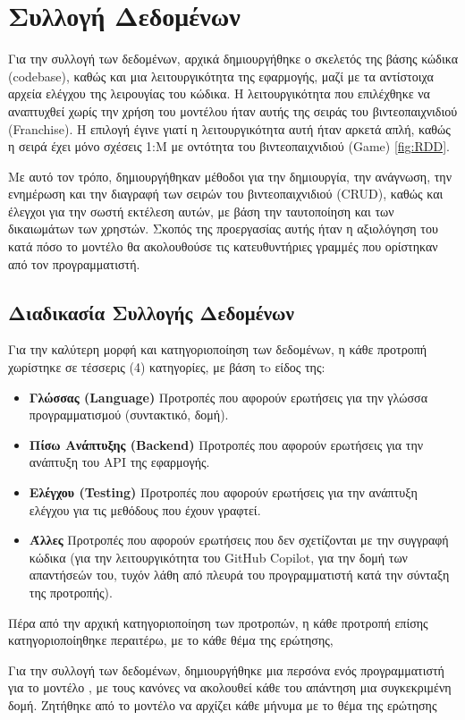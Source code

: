 \section{Συλλογή Δεδομένων}

Για την συλλογή των δεδομένων, αρχικά δημιουργήθηκε ο σκελετός της βάσης κώδικα \textlatin{(codebase)}, καθώς και μια λειτουργικότητα της εφαρμογής, μαζί με τα αντίστοιχα αρχεία ελέγχου της λειρουγίας του κώδικα. Η λειτουργικότητα που επιλέχθηκε να αναπτυχθεί χωρίς την χρήση του μοντέλου ήταν αυτής της σειράς του βιντεοπαιχνιδιού \textlatin{(Franchise)}. Η επιλογή έγινε γιατί η λειτουργικότητα αυτή ήταν αρκετά απλή, καθώς η σειρά έχει μόνο σχέσεις 1:Μ με οντότητα του βιντεοπαιχνιδιού \textlatin{(Game)} \ref{fig:RDD}. 

Με αυτό τον τρόπο, δημιουργήθηκαν μέθοδοι για την δημιουργία, την ανάγνωση, την ενημέρωση και την διαγραφή των σειρών του βιντεοπαιχνιδιού \textlatin{(CRUD)}, καθώς και έλεγχοι για την σωστή εκτέλεση αυτών, με βάση την ταυτοποίηση και των δικαιωμάτων των χρηστών. Σκοπός της προεργασίας αυτής ήταν η αξιολόγηση του κατά πόσο το μοντέλο θα ακολουθούσε τις κατευθυντήριες γραμμές που ορίστηκαν από τον προγραμματιστή.

\subsection{Διαδικασία Συλλογής Δεδομένων}
Για την καλύτερη μορφή και κατηγοριοποίηση των δεδομένων, η κάθε προτροπή χωρίστηκε σε τέσσερις (4) κατηγορίες, με βάση τo είδος της:

\begin{itemize}
  \item \textbf{Γλώσσας (\textlatin{Language})} Προτροπές που αφορούν ερωτήσεις για την γλώσσα προγραμματισμού (συντακτικό, δομή).
  \item \textbf{Πίσω  Ανάπτυξης (\textlatin{Backend})} Προτροπές που αφορούν ερωτήσεις για την ανάπτυξη του \textlatin{API} της εφαρμογής.
  \item \textbf{Ελέγχου (\textlatin{Testing})} Προτροπές που αφορούν ερωτήσεις για την ανάπτυξη ελέγχου για τις μεθόδους που έχουν γραφτεί.
  \item \textbf{Άλλες} Προτροπές που αφορούν ερωτήσεις που δεν σχετίζονται με την συγγραφή κώδικα (για την λειτουργικότητα του \textlatin{GitHub Copilot}, για την δομή των απαντήσεών του, τυχόν λάθη από πλευρά του προγραμματιστή κατά την σύνταξη της προτροπής).
\end{itemize}

Πέρα από την αρχική κατηγοριοποίηση των προτροπών, η κάθε προτροπή επίσης κατηγοριοποίηθηκε περαιτέρω, με το κάθε θέμα της ερώτησης,  

Για την συλλογή των δεδομένων, δημιουργήθηκε μια περσόνα ενός προγραμματιστή για το μοντέλο \cite{zhou2024sotopia,AitBaha2023, xu2023expertprompting}, με τους κανόνες να ακολουθεί κάθε του απάντηση μια συγκεκριμένη δομή. Ζητήθηκε από το μοντέλο να αρχίζει κάθε μήνυμα με το θέμα της ερώτησης 

